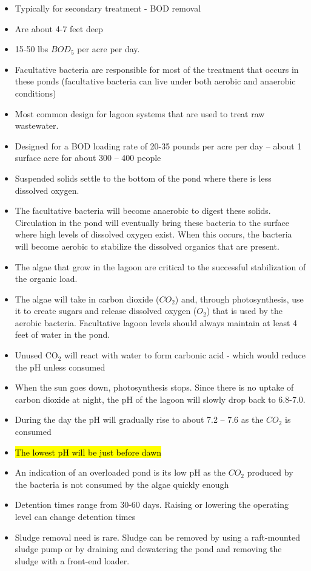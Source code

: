 \begin{itemize}
\item Typically for secondary treatment - BOD removal
\item Are about 4-7 feet deep
\item 15-50 lbs $BOD_5$ per acre per day.
\item Facultative bacteria are responsible for most of the treatment that occurs in these ponds (facultative bacteria can live under both aerobic and anaerobic conditions)
\item Most common design for lagoon systems that are used to treat raw wastewater. 
\item Designed for a BOD loading rate of 20-35 pounds per acre per day – about 1 surface acre for about 300 – 400 people
\item Suspended solids settle to the bottom of the pond where there is less dissolved oxygen.  
\item The facultative bacteria will become anaerobic to digest these solids. Circulation in the pond will eventually bring these bacteria to the surface where high levels of dissolved oxygen exist. When this occurs, the bacteria will become aerobic to stabilize the dissolved organics that are present.
\item The algae that grow in the lagoon are critical to the successful stabilization of the organic load. 
\item The algae will take in carbon dioxide ($CO_2$) and, through photosynthesis, use it to create sugars and release dissolved oxygen ($O_2$) that is used by the aerobic bacteria. Facultative lagoon levels should always maintain at least 4 feet of water in the pond.
\item Unused CO$_2$ will react with water to form carbonic acid - which would reduce the pH unless consumed
\item When the sun goes down, photosynthesis stops. Since there is no uptake of carbon dioxide at night, the pH of the lagoon will slowly drop back to 6.8-7.0.
\item During the day the pH will gradually rise to about 7.2 – 7.6 as the $CO_2$ is consumed
\item \hl{The lowest pH will be just before dawn} 
\item An indication of an overloaded pond is its low pH as the $CO_2$ produced by the bacteria is not consumed by the algae quickly enough
\item Detention times range from 30-60 days. Raising or lowering the operating level can change detention times
\item Sludge removal need is rare.  Sludge can be removed by using a raft-mounted sludge pump or by draining and dewatering the pond and removing the sludge with a front-end loader.
\end{itemize} 


